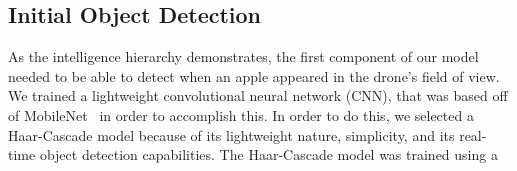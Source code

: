 \subsection{Initial Object Detection}
As the intelligence hierarchy demonstrates, the first component of our model needed to be able to detect when an apple appeared in the drone's field of view. 
We trained a lightweight convolutional neural network (CNN), that was based off of MobileNet~\cite{Sandler2018, } in order to accomplish this. 
In order to do this, we selected a Haar-Cascade model because of its lightweight nature, simplicity, and its real-time object detection capabilities. The Haar-Cascade model was trained using a 